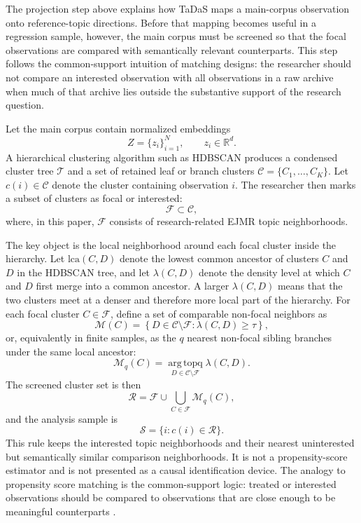 \documentclass[11pt]{article}
\begin{document}
The projection step above explains how TaDaS maps a main-corpus observation onto reference-topic directions. Before that mapping becomes useful in a regression sample, however, the main corpus must be screened so that the focal observations are compared with semantically relevant counterparts. This step follows the common-support intuition of matching designs: the researcher should not compare an interested observation with all observations in a raw archive when much of that archive lies outside the substantive support of the research question.

Let the main corpus contain normalized embeddings
\[
Z=\{z_i\}_{i=1}^N,\qquad z_i\in\mathbb{R}^d.
\]
A hierarchical clustering algorithm such as HDBSCAN produces a condensed cluster tree $\mathcal{T}$ and a set of retained leaf or branch clusters $\mathcal{C}=\{C_1,\dots,C_K\}$. Let $c(i)\in\mathcal{C}$ denote the cluster containing observation $i$. The researcher then marks a subset of clusters as focal or interested:
\[
\mathcal{F}\subset\mathcal{C},
\]
where, in this paper, $\mathcal{F}$ consists of research-related EJMR topic neighborhoods.

The key object is the local neighborhood around each focal cluster inside the hierarchy. Let $\mathrm{lca}(C,D)$ denote the lowest common ancestor of clusters $C$ and $D$ in the HDBSCAN tree, and let $\lambda(C,D)$ denote the density level at which $C$ and $D$ first merge into a common ancestor. A larger $\lambda(C,D)$ means that the two clusters meet at a denser and therefore more local part of the hierarchy. For each focal cluster $C\in\mathcal{F}$, define a set of comparable non-focal neighbors as
\[
\mathcal{M}(C)
=
\left\{
D\in\mathcal{C}\setminus\mathcal{F}:
\lambda(C,D)\geq \tau
\right\},
\]
or, equivalently in finite samples, as the $q$ nearest non-focal sibling branches under the same local ancestor:
\[
\mathcal{M}_q(C)
=
\operatorname*{arg\,topq}_{D\in\mathcal{C}\setminus\mathcal{F}}
\lambda(C,D).
\]
The screened cluster set is then
\[
\mathcal{R}
=
\mathcal{F}\cup
\bigcup_{C\in\mathcal{F}}\mathcal{M}_q(C),
\]
and the analysis sample is
\[
\mathcal{S}
=
\{i: c(i)\in\mathcal{R}\}.
\]
This rule keeps the interested topic neighborhoods and their nearest uninterested but semantically similar comparison neighborhoods. It is not a propensity-score estimator and is not presented as a causal identification device. The analogy to propensity score matching is the common-support logic: treated or interested observations should be compared to observations that are close enough to be meaningful counterparts \citep{rosenbaum1983,heckman1998matching,dehejia2002}.
\end{document}
